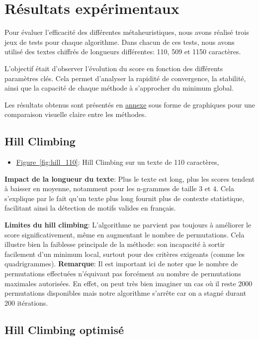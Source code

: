\documentclass[a4paper]{article}
\begin{document}
\section{Résultats expérimentaux}

Pour évaluer l’efficacité des différentes métaheuristiques, nous avons réalisé trois jeux de tests pour chaque algorithme. Dans chacun de ces tests, nous avons utilisé des textes chiffrés de longueurs différentes: 110, 509 et 1150 caractères.

L'objectif était d'observer l’évolution du score en fonction des différents paramètres clés. Cela permet d’analyser la rapidité de convergence, la stabilité, ainsi que la capacité de chaque méthode à s’approcher du minimum global.

Les résultats obtenus sont présentés en \hyperref[sec:annexes]{annexe} sous forme de graphiques pour une comparaison visuelle claire entre les méthodes.

\subsection{Hill Climbing}

\begin{itemize}
    \item \hyperref[fig:hill_110]{Figure~\ref*{fig:hill_110}}: Hill Climbing sur un texte de 110 caractères,
\end{itemize}

\textbf{Impact de la longueur du texte}: Plus le texte est long, plus les scores tendent à baisser en moyenne, notamment pour les n-grammes de taille $3$ et $4$. Cela s'explique par le fait qu’un texte plus long fournit plus de contexte statistique, facilitant ainsi la détection de motifs valides en français.

\textbf{Limites du hill climbing}: L’algorithme ne parvient pas toujours à améliorer le score significativement, même en augmentant le nombre de permutations. Cela illustre bien la faiblesse principale de la méthode: son incapacité à sortir facilement d’un minimum local, surtout pour des critères exigeants (comme les quadrigrammes).
\textbf{Remarque}: Il est important ici de noter que le nombre de permutations effectuées n'équivaut pas forcément au nombre de permutations maximales autorisées. En effet, on peut très bien imaginer un cas où il reste 2000 permutations disponibles mais notre algorithme s'arrête car on a stagné durant 200 itérations.


\subsection{Hill Climbing optimisé}
\end{document}
